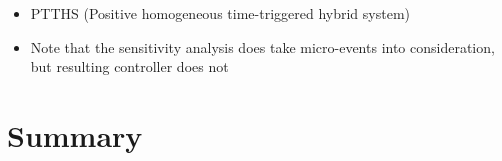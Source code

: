 \documentclass[../DC2017114Bouma.tex]{subfiles}
\begin{document}
\begin{itemize}
\item PTTHS (Positive homogeneous time-triggered hybrid system)
\item Note that the sensitivity analysis does take micro-events into consideration, but resulting controller does not
\end{itemize}
%
%
%
%
%
%

\section{Summary}
\end{document}
